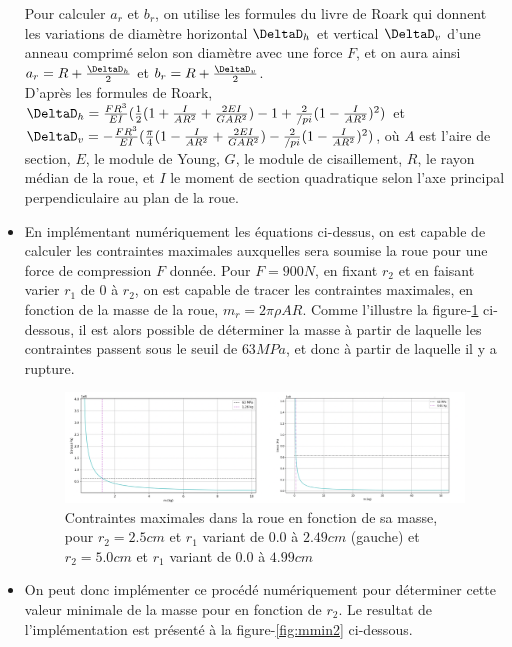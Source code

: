 \begin{itemize}
    Pour calculer $a_r$ et $b_r$, on utilise les formules du livre de Roark qui donnent les variations de diamètre horizontal $\DeltaD_h$ et vertical $\DeltaD_v$ d'une anneau comprimé selon son diamètre avec une force $F$, et on aura ainsi $a_r=R+\frac{\DeltaD_h}{2}$ et $b_r=R+\frac{\DeltaD_v}{2}$.\\
    D'après les formules de Roark, $\DeltaD_h=\frac{FR^3}{EI}(\frac{1}{2}(1+\frac{I}{AR^2}+\frac{2EI}{GAR^2})-1+\frac{2}{/pi}(1-\frac{I}{AR^2})^2)$ et $\DeltaD_v=-\frac{FR^3}{EI}(\frac{\pi}{4}(1-\frac{I}{AR^2}+\frac{2EI}{GAR^2})-\frac{2}{/pi}(1-\frac{I}{AR^2})^2)$, où $A$ est l'aire de section, $E$, le module de Young, $G$, le module de cisaillement, $R$, le rayon médian de la roue, et $I$ le moment de section quadratique selon l'axe principal perpendiculaire au plan de la roue.
    \item En implémentant numériquement les équations ci-dessus, on est capable de calculer les contraintes maximales auxquelles sera soumise la roue pour une force de compression $F$ donnée. Pour $F=900N$, en fixant $r_2$ et en faisant varier $r_1$ de $0$ à $r_2$, on est capable de tracer les contraintes maximales, en fonction de la masse de la roue, $m_r=2\pi\rho A R$. Comme l'illustre la figure-\ref{fig:mmin1} ci-dessous, il est alors possible de déterminer la masse à partir de laquelle les contraintes passent sous le seuil de $63 MPa$, et donc à partir de laquelle il y a rupture.

\begin{figure}[htb]
\centering
\includegraphics[width=7in]{images_2ddl/mmin1.png}
\caption{Contraintes maximales dans la roue en fonction de sa masse, pour $r_2=2.5 cm$ et $r_1$ variant de $0.0$ à $2.49 cm$ (gauche) et $r_2=5.0 cm$ et $r_1$ variant de $0.0$ à $4.99 cm$}
\label{fig:mmin1}
\end{figure}



\item On peut donc implémenter ce procédé numériquement pour déterminer cette valeur minimale de la masse pour en fonction de $r_2$. Le resultat de l'implémentation est présenté à la figure-\ref{fig:mmin2} ci-dessous. 


\end{itemize}
